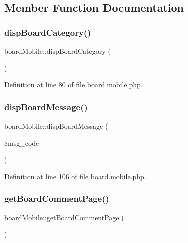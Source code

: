 \subsection{Member Function Documentation}
\hypertarget{classboardMobile_a8a6e7bb91059739116011375cf62ff91}{}\label{classboardMobile_a8a6e7bb91059739116011375cf62ff91} 
\subsubsection{\texorpdfstring{disp\+Board\+Category()}{dispBoardCategory()}}
{\footnotesize\ttfamily board\+Mobile\+::disp\+Board\+Category (\begin{DoxyParamCaption}{ }\end{DoxyParamCaption})}



Definition at line 80 of file board.\+mobile.\+php.

\hypertarget{classboardMobile_aa25065243c3bfab1ef936b7db897a527}{}\label{classboardMobile_aa25065243c3bfab1ef936b7db897a527} 
\subsubsection{\texorpdfstring{disp\+Board\+Message()}{dispBoardMessage()}}
{\footnotesize\ttfamily board\+Mobile\+::disp\+Board\+Message (\begin{DoxyParamCaption}\item[{}]{\$msg\+\_\+code }\end{DoxyParamCaption})}



Definition at line 106 of file board.\+mobile.\+php.

\hypertarget{classboardMobile_a023ac488f13a61b76acf5a22c1a64e8a}{}\label{classboardMobile_a023ac488f13a61b76acf5a22c1a64e8a} 
\subsubsection{\texorpdfstring{get\+Board\+Comment\+Page()}{getBoardCommentPage()}}
{\footnotesize\ttfamily board\+Mobile\+::get\+Board\+Comment\+Page (\begin{DoxyParamCaption}{ }\end{DoxyParamCaption})}



